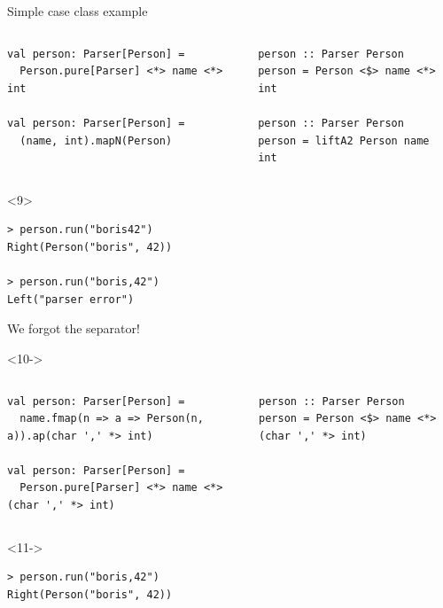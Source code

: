 \documentclass[presentation,aspectratio=169,smaller]{beamer}
\begin{document}
\begin{frame}[label={sec:orgecaa843},fragile,t]{Simple case class example}
\begin{onlyenv}
\begin{columns}
\begin{column}[t]{0.5\columnwidth}
\begin{verbatim}
val person: Parser[Person] =
  Person.pure[Parser] <*> name <*> int

val person: Parser[Person] =
  (name, int).mapN(Person)
\end{verbatim}
\end{column}

\begin{column}[t]{0.5\columnwidth}
\begin{verbatim}
person :: Parser Person
person = Person <$> name <*> int

person :: Parser Person
person = liftA2 Person name int
\end{verbatim}
\end{column}
\end{columns}
\end{onlyenv}

\begin{onlyenv}<9>
\begin{verbatim}
> person.run("boris42")
Right(Person("boris", 42))

> person.run("boris,42")
Left("parser error")
\end{verbatim}

We forgot the separator!
\end{onlyenv}

\begin{onlyenv}<10->
\begin{columns}
\begin{column}[t]{0.5\columnwidth}
\begin{verbatim}
val person: Parser[Person] =
  name.fmap(n => a => Person(n, a)).ap(char ',' *> int)

val person: Parser[Person] =
  Person.pure[Parser] <*> name <*> (char ',' *> int)
\end{verbatim}
\end{column}

\begin{column}[t]{0.5\columnwidth}
\begin{verbatim}
person :: Parser Person
person = Person <$> name <*> (char ',' *> int)
\end{verbatim}
\end{column}
\end{columns}
\end{onlyenv}

\begin{onlyenv}<11->
\begin{verbatim}
> person.run("boris,42")
Right(Person("boris", 42))
\end{verbatim}
\end{onlyenv}
\end{frame}
\end{document}
